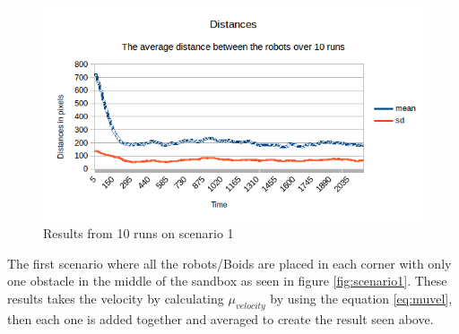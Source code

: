 \begin{figure}[h]
\begin{center}
\includegraphics[width=1.1\linewidth]{figs/resdistancescene1.png}
\end{center}
\caption[Results 1]{Results from 10 runs on scenario 1}
\label{fig:scene1res}
\end{figure}

The first scenario where all the robots/Boids are placed in each corner with only one obstacle in the middle of the sandbox as seen in figure \ref{fig:scenario1}. 
These results takes the velocity by calculating $\mu_{velocity}$ by using the equation \ref{eq:muvel}, then each one is added together and averaged to create the result seen above. 

